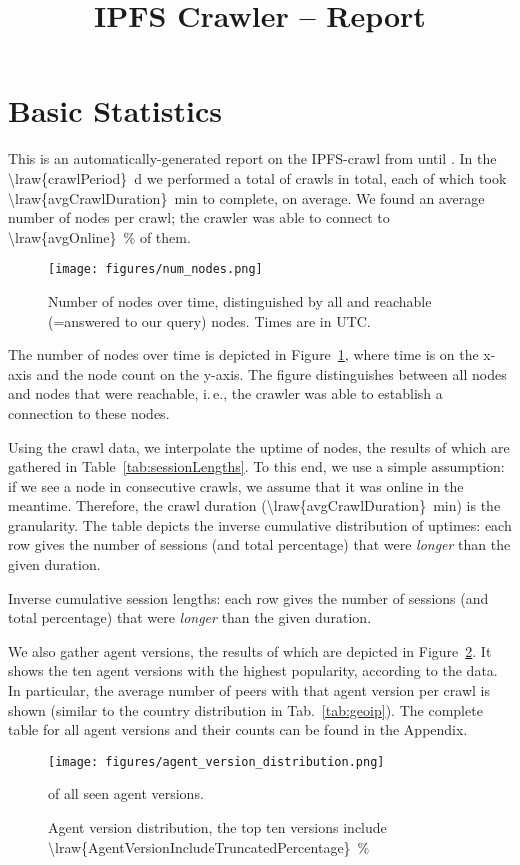 \documentclass[10pt]{article}
\title{IPFS Crawler -- Report}
\makeatletter
\newcommand*{\ie}{i.\,e.\@\xspace}
\makeatother
\begin{document}
\maketitle

\section{Basic Statistics}
\label{sec:basic}

This is an automatically-generated report on the IPFS-crawl from  until .
In the \SI{\lraw{crawlPeriod}}{\day} we performed a total of  crawls in total, each of which took \SI{\lraw{avgCrawlDuration}}{\minute} to complete, on average.
We found an average number of  nodes per crawl; the crawler was able to connect to \SI{\lraw{avgOnline}}{\percent} of them.
%
\begin{figure}[ht]
\centering
  \texttt{[image: figures/num\_nodes.png]}
  \caption{Number of nodes over time, distinguished by all and reachable (=answered to our query) nodes. Times are in UTC.}
  \label{fig:num_nodes}
\end{figure}
%
The number of nodes over time is depicted in Figure~\ref{fig:num_nodes}, where time is on the x-axis and the node count on the y-axis.
The figure distinguishes between all nodes and nodes that were reachable, \ie, the crawler was able to establish a connection to these nodes.

Using the crawl data, we interpolate the uptime of nodes, the results of which are gathered in Table~\ref{tab:sessionLengths}.
To this end, we use a simple assumption: if we see a node in consecutive crawls, we assume that it was online in the meantime.
Therefore, the crawl duration (\SI{\lraw{avgCrawlDuration}}{\minute}) is the granularity.
The table depicts the inverse cumulative distribution of uptimes: each row gives the number of sessions (and total percentage) that were \emph{longer} than the given duration.
%
\begin{table}
  \center
  
  \caption{Inverse cumulative session lengths: each row gives the number of sessions (and total percentage) that were \emph{longer} than the given duration.}
  \label{tab:sessionLengths}
\end{table}
%

We also gather agent versions, the results of which are depicted in Figure~\ref{figs:agent_version_distribution}.
It shows the ten agent versions with the highest popularity, according to the data.
In particular, the average number of peers with that agent version per crawl is shown (similar to the country distribution in Tab.~\ref{tab:geoip}).
The complete table for all agent versions and their counts can be found in the Appendix.
%
\begin{figure}[ht]
  \centering
  \texttt{[image: figures/agent\_version\_distribution.png]}
  \caption{Agent version distribution, the top ten versions include \SI{\lraw{AgentVersionIncludeTruncatedPercentage}}{\percent}} of all seen agent versions.
  \label{figs:agent_version_distribution}
\end{figure}
\end{document}
